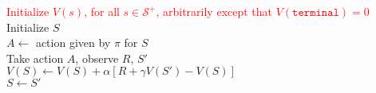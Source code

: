 \documentclass{standalone}
\begin{document}
\pagestyle{empty}
\begin{algorithm}[H]
  \KwInput{The policy $\pi$ to be evaluated; step size $\alpha \in (0, 1]$}
  \textcolor{red}{Initialize $V(s)$, for all $s \in \mathcal S^+$, arbitrarily except that   $V(\texttt{terminal}) = 0$}\\
 {
  Initialize $S$ \\
   {
    $A \gets $ action given by $\pi$ for $S$ \\
    Take action $A$, observe $R$, $S'$ \\
    $V(S) \gets V(S) + \alpha \left[ R + \gamma V(S') - V(S) \right]$ \\
    $S \gets S'$
  }
}
\end{algorithm}
\end{document}
